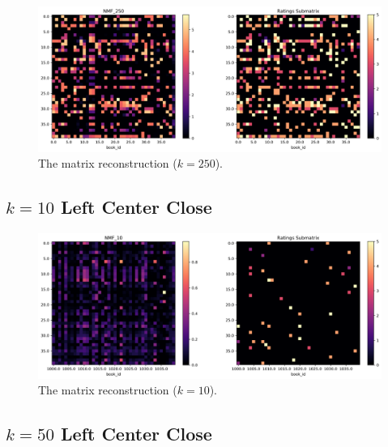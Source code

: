 \documentclass[handout]{beamer}
\begin{document}
\begin{frame}
 \begin{figure}[t]
    \includegraphics[width=\linewidth]{../image/goodreads-models/nmf-250-left-close.png}
    \caption[NMF-250-left-close]{The matrix reconstruction ($k=250$).}
     \label{fig:nmf-250-left-close}
\end{figure}
\end{frame}

\subsection{$k=10$ Left Center Close}\label{k-10-left-center-close}


\begin{frame}
 \begin{figure}[t]
    \includegraphics[width=\linewidth]{../image/goodreads-models/nmf-10-left-center-close.png}
    \caption[NMF-10-left-center-close]{The matrix reconstruction ($k=10$).}
     \label{fig:nmf-10-left-center-close}
\end{figure}
\end{frame}

\subsection{$k=50$ Left Center Close}\label{k-50-left-center-close}
\end{document}
